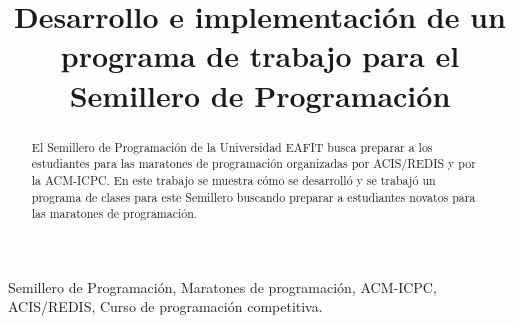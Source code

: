 \documentclass[conference]{IEEEtran}
\begin{document}
%
\title{Desarrollo e implementación de un programa de trabajo para el Semillero de Programación}


\author{
\and
{}
}


\maketitle


\begin{abstract}
El Semillero de Programación de la Universidad EAFIT busca preparar a los estudiantes para las maratones de programación organizadas por ACIS/REDIS y por la ACM-ICPC. En este trabajo se muestra cómo se desarrolló y se trabajó un programa de clases para este Semillero buscando preparar a estudiantes novatos para las maratones de programación. 
\end{abstract}

\begin{keywords}
Semillero de Programación, Maratones de programación, ACM-ICPC, ACIS/REDIS, Curso de programación competitiva.
\end{keywords}
\end{document}
